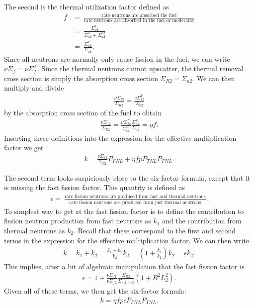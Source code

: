 The second is the thermal utilization factor defined as
\begin{align}
  f 	&= \ \frac{\text{rate neutrons are absorbed the fuel}}{\text{rate neutrons are absorbed in the fuel or moderator}} \nonumber \\
  		&= \ \frac{\Sigma_{a2}^F}{\Sigma_{a2}^F + \Sigma_{a2}^M} \nonumber \\
		&= \ \frac{\Sigma_{a2}^F}{\Sigma_{a2}} .
\end{align}
Since all neutrons are normally only cause fission in the fuel, we can write $\nu\Sigma_f = \nu\Sigma_f^F$. Since the thermal neutrons cannot upscatter, the thermal removal cross section is simply the absorption cross section $\Sigma_{R2} = \Sigma_{a2}$. We can then multiply and divide
\begin{align}
  \frac{ \nu\Sigma_{f2} }{ \Sigma_{R2} } = \frac{ \nu\Sigma_{f2}^F }{ \Sigma_{a2} } \nonumber
\end{align}
by the absorption cross section of the fuel to obtain
\begin{align}
  \frac{ \nu\Sigma_{f2} }{ \Sigma_{R2} } = \frac{ \nu\Sigma_{f2}^F }{ \Sigma_{a2}^F } \frac{ \Sigma_{a2}^F }{ \Sigma_{a2} } = \eta f .
\end{align}
Inserting these definitions into the expression for the effective multiplication factor we get
\begin{align}
  k = \frac{ \nu\Sigma_{f1} }{ \Sigma_{R1} } P_{FNL} + \eta f p P_{TNL} P_{FNL} .
\end{align}

The second term looks suspiciously close to the six-factor formula, except that it is missing the fast fission factor. This quantity is defined as
\begin{align}
  \epsilon = \ \frac{\text{rate fission neutrons are produced from fast and thermal neutrons}}{\text{rate fission neutrons are produced from just thermal neutrons}}. \nonumber
\end{align}
To simplest way to get at the fast fission factor is to define the contribution to fission neutron production from fast neutrons as $k_1$ and the contribution from thermal neutrons as $k_2$. Recall that these correspond to the first and second terms in the expression for the effective multiplication factor. We can then write
\begin{align}
  k = k_1 + k_2 = \frac{ k_1 + k_2 }{ k_2 } k_2  = \left( 1 + \frac{k_1}{k_2} \right) k_2 = \epsilon k_2 .
\end{align}
This implies, after a bit of algebraic manipulation that the fast fission factor is
\begin{align}
  \epsilon = 1 + \frac{ \nu\Sigma_{f1} }{ \nu\Sigma_{f2} } \frac{ \Sigma_{R2} }{ \Sigma_{s,1\rightarrow 2}} ( 1 + B^2 L_2^2 ) .
\end{align}
Given all of these terms, we then get the six-factor formula:
\begin{align}
  k = \eta f p \epsilon P_{FNL} P_{TNL} .
\end{align}

